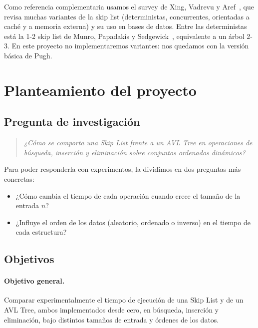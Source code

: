 \documentclass[11pt,a4paper]{article}
\begin{document}
Como referencia complementaria usamos el survey de Xing, Vadrevu y
Aref~\cite{vadrevu2024}, que revisa muchas variantes de la skip list
(deterministas, concurrentes, orientadas a caché y a memoria externa) y su uso
en bases de datos. Entre las deterministas está la 1-2 skip list de Munro,
Papadakis y Sedgewick~\cite{munro1992}, equivalente a un árbol 2-3. En este
proyecto no implementaremos variantes: nos quedamos con la versión básica de
Pugh.

\section{Planteamiento del proyecto}\label{sec:plan}

\subsection{Pregunta de investigación}

\begin{quote}
\itshape
¿Cómo se comporta una Skip List frente a un AVL Tree en operaciones de
búsqueda, inserción y eliminación sobre conjuntos ordenados dinámicos?
\end{quote}

Para poder responderla con experimentos, la dividimos en dos preguntas más
concretas:
\begin{itemize}
  \item[\textbf{P1.}] ¿Cómo cambia el tiempo de cada operación cuando crece el
  tamaño de la entrada $n$?
  \item[\textbf{P2.}] ¿Influye el orden de los datos (aleatorio, ordenado o
  inverso) en el tiempo de cada estructura?
\end{itemize}

\subsection{Objetivos}

\paragraph{Objetivo general.}
Comparar experimentalmente el tiempo de ejecución de una Skip List y de un AVL
Tree, ambos implementados desde cero, en búsqueda, inserción y eliminación,
bajo distintos tamaños de entrada y órdenes de los datos.
\end{document}
